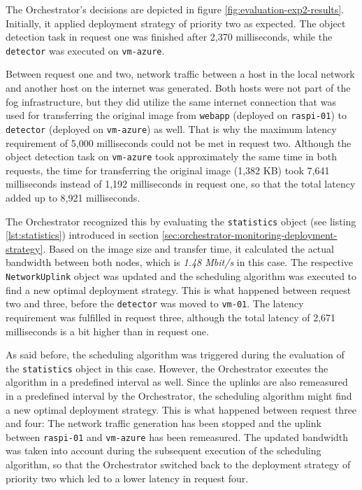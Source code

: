 The Orchestrator's decisions are depicted in figure \ref{fig:evaluation-exp2-results}. 
Initially, it applied deployment strategy of priority two as expected.
The object detection task in request one was finished after 2,370 milliseconds, while the \texttt{detector} was executed on \texttt{vm-azure}.

Between request one and two, network traffic between a host in the local network and another host on the internet was generated.
Both hosts were not part of the fog infrastructure, but they did utilize the same internet connection that was used for transferring the original image from \texttt{webapp} (deployed on \texttt{raspi-01}) to \texttt{detector} (deployed on \texttt{vm-azure}) as well.
That is why the maximum latency requirement of 5,000 milliseconds could not be met in request two.
Although the object detection task on \texttt{vm-azure} took approximately the same time in both requests, the time for transferring the original image (1,382 KB) took 7,641 milliseconds instead of 1,192 milliseconds in request one, so that the total latency added up to 8,921 milliseconds.

The Orchestrator recognized this by evaluating the \texttt{statistics} object (see listing \ref{lst:statistics}) introduced in section \ref{sec:orchestrator-monitoring-deployment-strategy}.
Based on the image size and transfer time, it calculated the actual bandwidth between both nodes, which is \textit{1.48 Mbit/s} in this case.
The respective \texttt{NetworkUplink} object was updated and the scheduling algorithm was executed to find a new optimal deployment strategy.
This is what happened between request two and three, before the \texttt{detector} was moved to \texttt{vm-01}.
The latency requirement was fulfilled in request three, although the total latency of 2,671 milliseconds is a bit higher than in request one.

As said before, the scheduling algorithm was triggered during the evaluation of the \texttt{statistics} object in this case.
However, the Orchestrator executes the algorithm in a predefined interval as well.
Since the uplinks are also remeasured in a predefined interval by the Orchestrator, the scheduling algorithm might find a new optimal deployment strategy.
This is what happened between request three and four:
The network traffic generation has been stopped and the uplink between \texttt{raspi-01} and \texttt{vm-azure} has been remeasured.
The updated bandwidth was taken into account during the subsequent execution of the scheduling algorithm, so that the Orchestrator switched back to the deployment strategy of priority two which led to a lower latency in request four.

